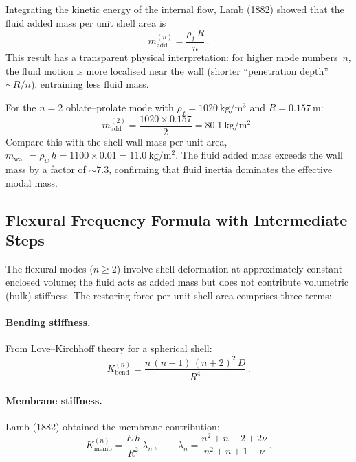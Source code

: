 \documentclass[12pt]{article}
\begin{document}
Integrating the kinetic energy of the internal flow, Lamb (1882) showed that
the fluid added mass per unit shell area is
\begin{equation}
  m_{\mathrm{add}}^{(n)} = \frac{\rho_{f}\,R}{n}\,.
  \tag{S2}
  \label{eq:m_add}
\end{equation}
This result has a transparent physical interpretation: for higher mode
numbers~$n$, the fluid motion is more localised near the wall (shorter
``penetration depth'' $\sim R/n$), entraining less fluid mass.

For the $n=2$ oblate--prolate mode with $\rho_{f} = \SI{1020}{\kilo\gram\per\metre\cubed}$
and $R = \SI{0.157}{\metre}$:
\[
  m_{\mathrm{add}}^{(2)} = \frac{1020 \times 0.157}{2}
    = \SI{80.1}{\kilo\gram\per\metre\squared} \,.
\]
Compare this with the shell wall mass per unit area,
$m_{\mathrm{wall}} = \rho_{w}\,h = 1100 \times 0.01 = \SI{11.0}{\kilo\gram\per\metre\squared}$.
The fluid added mass exceeds the wall mass by a factor of ${\sim}7.3$, confirming
that fluid inertia dominates the effective modal mass.

\subsection{Flexural Frequency Formula with Intermediate Steps}
\label{sec:flex_freq}

The flexural modes ($n \geq 2$) involve shell deformation at approximately
constant enclosed volume; the fluid acts as added mass but does not contribute
volumetric (bulk) stiffness.  The restoring force per unit shell area
comprises three terms:

\paragraph{Bending stiffness.}
From Love--Kirchhoff theory for a spherical shell:
\begin{equation}
  K_{\mathrm{bend}}^{(n)} = \frac{n\,(n-1)\,(n+2)^{2}\,D}{R^{4}} \,.
  \tag{S3}
  \label{eq:Kbend}
\end{equation}

\paragraph{Membrane stiffness.}
Lamb (1882) obtained the membrane contribution:
\begin{equation}
  K_{\mathrm{memb}}^{(n)} = \frac{E\,h}{R^{2}}\,\lambda_{n}\,,
  \qquad
  \lambda_{n} = \frac{n^{2}+n-2+2\nu}{n^{2}+n+1-\nu} \,.
  \tag{S4}
  \label{eq:Kmemb}
\end{equation}
\end{document}
